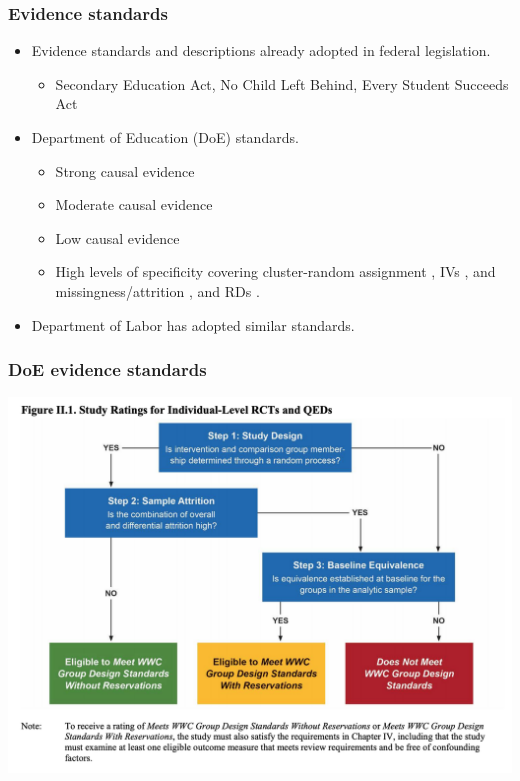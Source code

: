 \documentclass[usenames,dvipsnames]{beamer}
\begin{document}
\begin{frame}
\frametitle{Evidence standards}

\begin{itemize}
\item Evidence standards and descriptions already adopted in federal legislation.
\begin{itemize}
\item Secondary Education Act, No Child Left Behind, Every Student Succeeds Act
\end{itemize}
\pause
\vspace{0.5cm}
\item Department of Education (DoE) standards.
\begin{itemize}
\item Strong causal evidence
\item Moderate causal evidence
\item Low causal evidence
\item High levels of specificity covering cluster-random assignment \hyperlink{doe_cluster}{}, IVs \hyperlink{doe_iv}{}, and missingness/attrition \hyperlink{doe_missing}{}, and RDs \hyperlink{doe_rd}{}. 
\end{itemize}
\pause
\item Department of Labor has adopted similar standards.
\end{itemize}

\end{frame}


\begin{frame}
\frametitle{DoE evidence standards}

\begin{center}
\vspace{-0.85cm}
\hspace*{-1cm}
\includegraphics[scale=0.57]{../figs/DoE_standards.png} 
\end{center}


\end{frame}
\end{document}
